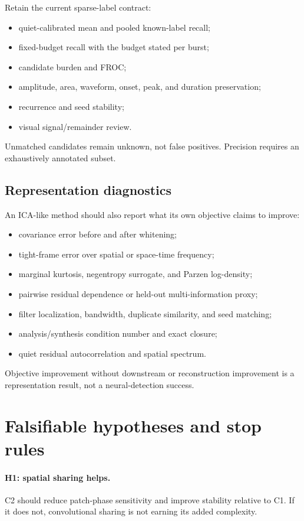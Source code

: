 \documentclass[11pt]{article}
\begin{document}
Retain the current sparse-label contract:
\begin{itemize}[leftmargin=*]
\item quiet-calibrated mean and pooled known-label recall;
\item fixed-budget recall with the budget stated per burst;
\item candidate burden and FROC;
\item amplitude, area, waveform, onset, peak, and duration preservation;
\item recurrence and seed stability;
\item visual signal/remainder review.
\end{itemize}
Unmatched candidates remain unknown, not false positives. Precision requires an
exhaustively annotated subset.

\subsection{Representation diagnostics}

An ICA-like method should also report what its own objective claims to improve:
\begin{itemize}[leftmargin=*]
\item covariance error before and after whitening;
\item tight-frame error over spatial or space-time frequency;
\item marginal kurtosis, negentropy surrogate, and Parzen log-density;
\item pairwise residual dependence or held-out multi-information proxy;
\item filter localization, bandwidth, duplicate similarity, and seed matching;
\item analysis/synthesis condition number and exact closure;
\item quiet residual autocorrelation and spatial spectrum.
\end{itemize}
Objective improvement without downstream or reconstruction improvement is a
representation result, not a neural-detection success.

\section{Falsifiable hypotheses and stop rules}

\paragraph{H1: spatial sharing helps.}
C2 should reduce patch-phase sensitivity and improve stability relative to C1.
If it does not, convolutional sharing is not earning its added complexity.
\end{document}
